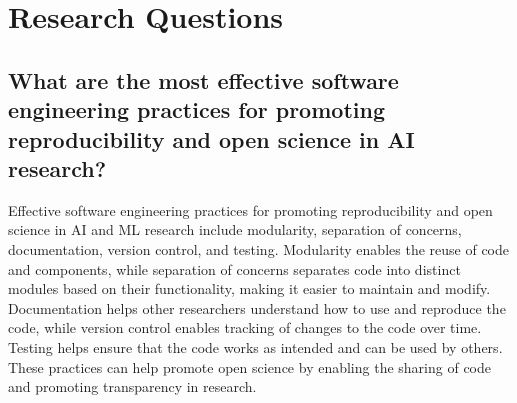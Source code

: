 
\section{Research Questions}


\subsection{
    What are the most effective software engineering practices for promoting reproducibility and open science in AI research?}
    Effective software engineering practices for promoting reproducibility and open science in AI and ML research include modularity, separation of concerns, documentation, version control, and testing. Modularity enables the reuse of code and components, while separation of concerns separates code into distinct modules based on their functionality, making it easier to maintain and modify. Documentation helps other researchers understand how to use and reproduce the code, while version control enables tracking of changes to the code over time. Testing helps ensure that the code works as intended and can be used by others. These practices can help promote open science by enabling the sharing of code and promoting transparency in research.
    
    
    
    
